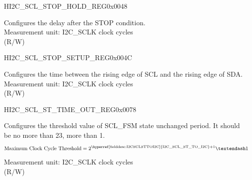 \begin{register}{H}{I2C\_SCL\_STOP\_HOLD\_REG}{0x0048}\label{regdesc:I2CSCLSTOPHOLDREG}
%
%
\regnewline%
\begin{regdesc}\begin{reglist}
\label{fielddesc:I2CSCLSTOPHOLDTIME}\item [I2C\_SCL\_STOP\_HOLD\_TIME] Configures the delay after the STOP condition.\\
Measurement unit: I2C\_SCLK clock cycles \\ (R/W)
\end{reglist}\end{regdesc}
\end{register}


\begin{register}{H}{I2C\_SCL\_STOP\_SETUP\_REG}{0x004C}\label{regdesc:I2CSCLSTOPSETUPREG}
%
%
\regnewline%
\begin{regdesc}\begin{reglist}
\label{fielddesc:I2CSCLSTOPSETUPTIME}\item [I2C\_SCL\_STOP\_SETUP\_TIME] Configures the time between the rising edge of SCL and the rising edge of SDA.\\
Measurement unit: I2C\_SCLK clock cycles \\ (R/W)
\end{reglist}\end{regdesc}
\end{register}


\begin{register}{H}{I2C\_SCL\_ST\_TIME\_OUT\_REG}{0x0078}\label{regdesc:I2CSCLSTTIMEOUTREG}
%
%
\regnewline%
\begin{regdesc}\begin{reglist}
\label{fielddesc:I2CSCLSTTOI2C}\item [I2C\_SCL\_ST\_TO\_I2C] Configures the threshold value of SCL\_FSM state unchanged period. It should be no more than 23, more than 1.\\
\[
\text{Maximum Clock Cycle Threshold} = 2^{\text{\hyperref[fielddesc:I2CSCLSTTOI2C]{I2C\_SCL\_ST\_TO\_I2C}} + 1}–1
\]
Measurement unit: I2C\_SCLK clock cycles \\ (R/W)
\end{reglist}\end{regdesc}
\end{register}


